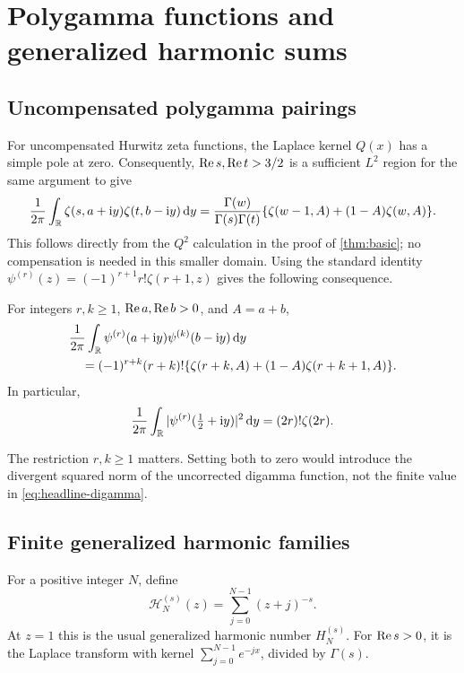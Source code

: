 \section{Polygamma functions and generalized harmonic sums}
\label{sec:harmonics}

\subsection{Uncompensated polygamma pairings}
For uncompensated Hurwitz zeta functions, the Laplace kernel $Q(x)$ has a
simple pole at zero. Consequently, $\operatorname{Re} s,\operatorname{Re} t>3/2$ is a sufficient
$L^2$ region for the same argument to give
\begin{equation}\label{eq:plain-zeta-pair}
 \frac1{2\pi}\int_{\mathbb R}\zeta(s,a+\mathrm i y)\zeta(t,b-\mathrm i y)\,\mathrm d y
 =\frac{\Gamma(w)}{\Gamma(s)\Gamma(t)}
       \{\zeta(w-1,A)+(1-A)\zeta(w,A)\}.
\end{equation}
This follows directly from the $Q^2$ calculation in the proof of
\cref{thm:basic}; no compensation is needed in this smaller domain.
Using the standard identity
$\psi^{(r)}(z)=(-1)^{r+1}r!\zeta(r+1,z)$ gives the following consequence.

\begin{corollary}\label{thm:polygamma}
For integers $r,k\ge1$, $\operatorname{Re} a,\operatorname{Re} b>0$, and $A=a+b$,
\begin{align}
 &\frac1{2\pi}\int_{\mathbb R}\psi^{(r)}(a+\mathrm i y)
                                  \psi^{(k)}(b-\mathrm i y)\,\mathrm d y\notag\\
 &\quad=(-1)^{r+k}(r+k)!
      \{\zeta(r+k,A)+(1-A)\zeta(r+k+1,A)\}.\label{eq:polygamma-pair}
\end{align}
In particular,
\begin{equation}\label{eq:polygamma-norm}
 \frac1{2\pi}\int_{\mathbb R}
       |\psi^{(r)}(\tfrac12+\mathrm i y)|^2\,\mathrm d y=(2r)!\zeta(2r).
\end{equation}
\end{corollary}
The restriction $r,k\ge1$ matters. Setting both to zero would introduce
the divergent squared norm of the uncorrected digamma function, not the
finite value in \eqref{eq:headline-digamma}.

\subsection{Finite generalized harmonic families}
For a positive integer $N$, define
\begin{equation}\label{eq:finite-H}
 \mathcal H_N^{(s)}(z)=\sum_{j=0}^{N-1}(z+j)^{-s}.
\end{equation}
At $z=1$ this is the usual generalized harmonic number $H_N^{(s)}$.
For $\operatorname{Re} s>0$, it is the Laplace transform with kernel
$\sum_{j=0}^{N-1}e^{-jx}$, divided by $\Gamma(s)$.

